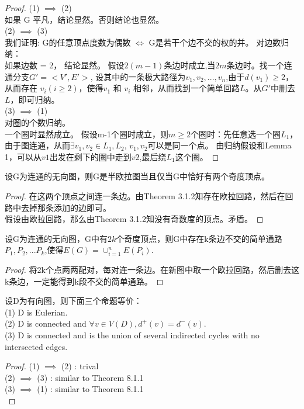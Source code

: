 \documentclass[11pt,fleqn]{book} %
\begin{document}
\begin{CJK}{UTF8}{gkai}
\begin{theorem}
\end{theorem}
\begin{proof} 
    (1) $\implies$ (2) \\
    如果 G 平凡，结论显然。否则结论也显然。 \\
    (2) $\implies$ (3) \\
    我们证明: G的任意顶点度数为偶数 $\iff$ G是若干个边不交的权的并。 对边数归纳： \\
    如果边数 = 2， 结论显然。 假设$2(m-1)$条边时成立,当$2m$条边时。找一个连通分支$G' = <V', E'>$, 设其中的一条极大路径为$v_1,v_2,...,v_n$,由于$d(v_1) \geq 2$，
    从而存在 $v_i(i \geq 2)$，使得$v_1$ 和 $v_i$ 相邻，从而找到一个简单回路$L$。从$G'$中删去$L$，即可归纳。\\
    (3) $\implies$ (1) \\
    对圈的个数归纳。\\
    一个圈时显然成立。
    假设m-1个圈时成立，则$m\geq 2$个圈时：先任意选一个圈$L_1$，由于图连通，从而$\exists v_1, v_2 \in L_1, L_2$, $v_1, v_2$可以是同一个点。 由归纳假设和Lemma 1，可以从$v1$出发在剩下的圈中走到$v2$,最后绕$L_1$这个圈。

\end{proof}

\begin{theorem}
    [半欧拉图的判定]
    设G为连通的无向图，则G是半欧拉图当且仅当G中恰好有两个奇度顶点。
\end{theorem}
\begin{proof}
    在这两个顶点之间连一条边。由Theorem 3.1.2知存在欧拉回路，然后在回路中去掉那条添加的边即可。\\
    假设由欧拉回路，那么由Theorem 3.1.2知没有奇数度的顶点。矛盾。
\end{proof}

\begin{corollary}
    设G为连通的无向图，G中有$2k$个奇度顶点，则G中存在k条边不交的简单通路$P_1,P_2,...P_k$,使得$E(G) = \cup_{i = 1}^nE(P_i)$.
\end{corollary}
\begin{proof}
    将2k个点两两配对，每对连一条边。在新图中取一个欧拉回路，然后删去这k条边，一定能得到k段不交的简单通路。    
\end{proof}

\begin{theorem}
    [有向欧拉图的判定]
    设D为有向图，则下面三个命题等价： \\
    (1) D is Eulerian. \\
    (2) D is connected and $\forall v \in V(D), d^+(v) = d^-(v)$. \\
    (3) D is connected and is the union of several indirected cycles with no intersected edges.
\end{theorem}
\begin{proof}
    (1) $\implies$ (2) : trival \\
    (2) $\implies$ (3) : similar to Theorem 8.1.1 \\
    (3) $\implies$ (1) : similar to Theorem 8.1.1 \\
\end{proof}


\end{CJK}
\end{document}
